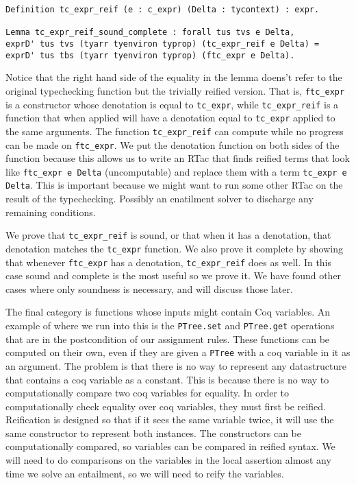 \documentclass{puthesis}
\begin{document}
\begin{lstlisting}
Definition tc_expr_reif (e : c_expr) (Delta : tycontext) : expr.

Lemma tc_expr_reif_sound_complete : forall tus tvs e Delta,
exprD' tus tvs (tyarr tyenviron typrop) (tc_expr_reif e Delta) =
exprD' tus tbs (tyarr tyenviron typrop) (ftc_expr e Delta).
\end{lstlisting}

Notice that the right hand side of the equality in the lemma doens't
refer to the original typechecking function but the trivially reified
version. That is, \lstinline|ftc_expr| is a constructor whose denotation is equal
to \lstinline|tc_expr|, while \lstinline|tc_expr_reif| is a function that when applied will have
a denotation equal to \lstinline|tc_expr| applied to the same arguments. The function
\lstinline|tc_expr_reif| can compute while no progress can be made on \lstinline|ftc_expr|.
We put the denotation function on both sides of the function because
this allows us to write an RTac that finds reified terms that look like
\lstinline|ftc_expr e Delta| (uncomputable) and replace them with a term
\lstinline|tc_expr e Delta|. This is important because we might want
to run some other RTac on the result of the typechecking. Possibly
an enatilment solver to discharge any remaining conditions. 

We prove that \lstinline|tc_expr_reif| is sound, or that when it has a denotation,
that denotation matches the \lstinline|tc_expr| function. We also prove it complete by
showing that whenever \lstinline|ftc_expr| has a denotation, \lstinline|tc_expr_reif| does as well.
In this case sound and complete is the most useful so we prove it. We have
found other cases where only soundness is necessary, and will discuss those
later.

The final category is functions whose inputs might contain Coq variables. An example
of where we run into this is the \lstinline|PTree.set| and \lstinline|PTree.get|
operations that are in the postcondition of our assignment rules. These functions
can be computed on their own, even if they are given a \lstinline|PTree| with a
coq variable in it as an argument. The problem is that there is no way to represent
any datastructure that contains a coq variable as a constant. This is because there
is no way to computationally compare two coq variables for equality. In order to 
computationally check equality over coq variables, they must first be reified.
Reification is designed so that if it sees the same variable twice, it will use
the same constructor to represent both instances. The constructors can be 
computationally compared, so variables can be compared in reified syntax.
We will need to do comparisons on the variables in the local assertion almost
any time we solve an entailment, so we will need to reify the variables.
\end{document}
